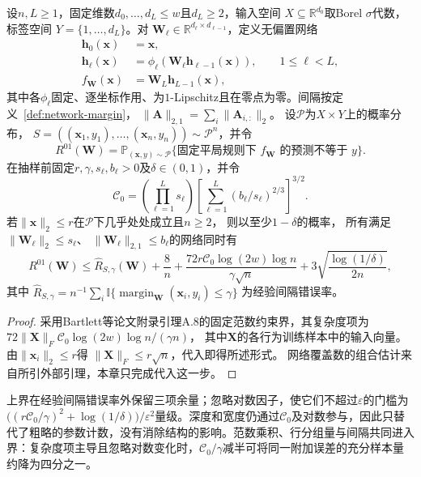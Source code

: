 \begin{theorem}[深层网络的谱复杂度与期望风险]
\label{thm:spectral-network-risk}
设$n,L\geq1$，固定维数$d_0,\ldots,d_L\leq w$且$d_L\geq2$，输入空间
$X\subseteq\mathbb R^{d_0}$取Borel $\sigma$代数，标签空间
$Y=\{1,\ldots,d_L\}$。对
$\bm W_\ell\in\mathbb R^{d_\ell\times d_{\ell-1}}$，定义无偏置网络
\[
\begin{aligned}
 \bm h_0(\bm x)&=\bm x,\\
 \bm h_\ell(\bm x)
 &=\phi_\ell(\bm W_\ell\bm h_{\ell-1}(\bm x)),
 \qquad 1\leq\ell<L,\\
 f_{\bm W}(\bm x)&=\bm W_L\bm h_{L-1}(\bm x),
\end{aligned}
\]
其中各$\phi_\ell$固定、逐坐标作用、为$1$-Lipschitz且在零点为零。间隔按定义~\ref{def:network-margin}，
$\|\bm A\|_{2,1}=\sum_i\|\bm A_{i,:}\|_2$。
设$\mathcal P$为$X\times Y$上的概率分布，
$S=((\bm x_1,y_1),\ldots,(\bm x_n,y_n))\sim\mathcal P^n$，并令
\[
 R^{01}(\bm W)
 =\mathbb P_{(\bm x,y)\sim\mathcal P}
   \{\text{固定平局规则下 }f_{\bm W}\text{ 的预测不等于 }y\}.
\]
在抽样前固定$r,\gamma,s_\ell,b_\ell>0$及$\delta\in(0,1)$，并令
\[
 \mathcal C_0=
 \left(\prod_{\ell=1}^L s_\ell\right)
 \left[\sum_{\ell=1}^L(b_\ell/s_\ell)^{2/3}\right]^{3/2}.
\]
若$\|\bm x\|_2\leq r$在$\mathcal P$下几乎处处成立且$n\geq2$，
则以至少$1-\delta$的概率，
所有满足$\|\bm W_\ell\|_2\leq s_\ell$、
$\|\bm W_\ell\|_{2,1}\leq b_\ell$的网络同时有
\begin{equation}
 R^{01}(\bm W)\leq\hat R_{S,\gamma}(\bm W)+\frac8n
 +\frac{72r\mathcal C_0\log(2w)\log n}{\gamma\sqrt n}
 +3\sqrt{\frac{\log(1/\delta)}{2n}},
 \label{eq:spectral-risk-explicit}
\end{equation}
其中
$\hat R_{S,\gamma}=n^{-1}\sum_i
\mathbb I\{\operatorname{margin}_{\bm W}(\bm x_i,y_i)\leq\gamma\}$
为经验间隔错误率。
\end{theorem}
\begin{proof}
采用Bartlett等论文附录引理A.8的固定范数约束界，其复杂度项为
$72\|\bm X\|_F\mathcal C_0\log(2w)\log n/(\gamma n)$，
其中$\bm X$的各行为训练样本中的输入向量。由$\|\bm x_i\|_2\leq r$得
$\|\bm X\|_F\leq r\sqrt n$，代入即得所述形式。
网络覆盖数的组合估计来自所引外部引理，本章只完成代入这一步。
\end{proof}

上界在经验间隔错误率外保留三项余量；忽略对数因子，使它们不超过$\varepsilon$的门槛为$\bigl((r\mathcal C_0/\gamma)^2+\log(1/\delta)\bigr)/\varepsilon^2$量级。深度和宽度仍通过$\mathcal C_0$及对数参与，因此只替代了粗略的参数计数，没有消除结构的影响。范数乘积、行分组量与间隔共同进入界：复杂度项主导且忽略对数变化时，$\mathcal C_0/\gamma$减半可将同一附加误差的充分样本量约降为四分之一。

